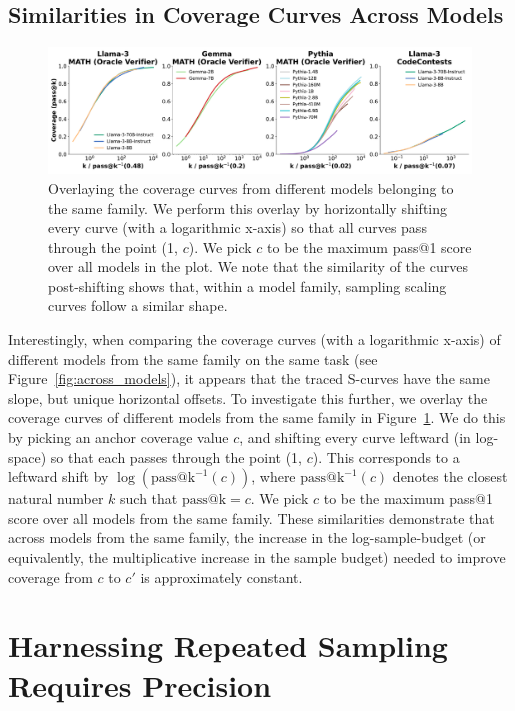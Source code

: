 \documentclass[11pt]{article}
\begin{document}
\subsection{Similarities in Coverage Curves Across Models}
\label{sec:similarities}

\begin{figure}
    \centering
    \includegraphics[width=\textwidth]{figures/align.pdf}
    \caption{Overlaying the coverage curves from different models belonging to the same family. We perform this overlay by horizontally shifting every curve (with a logarithmic x-axis) so that all curves pass through the point (1, $c$). We pick $c$ to be the maximum pass@1 score over all models in the plot. We note that the similarity of the curves post-shifting shows that, within a model family, sampling scaling curves follow a similar shape.}
    \label{fig:recentering}
\end{figure}



Interestingly, when comparing the coverage curves (with a logarithmic x-axis) of different models from the same family on the same task (see Figure~\ref{fig:across_models}), it appears that the traced S-curves have the same slope, but unique horizontal offsets. To investigate this further, we overlay the coverage curves of different models from the same family in Figure~\ref{fig:recentering}. We do this by picking an anchor coverage value $c$, and shifting every curve leftward (in log-space) so that each passes through the point (1, $c$). This corresponds to a leftward shift by $\log(\text{pass@k}^{-1}(c))$, where $\text{pass@k}^{-1}(c)$ denotes the closest natural number $k$ such that $\text{pass@k} = c$. We pick $c$ to be the maximum pass@1 score over all models from the same family. These similarities demonstrate that across models from the same family, the increase in the log-sample-budget (or equivalently, the multiplicative increase in the sample budget) needed to improve coverage from $c$ to $c'$ is approximately constant.

\section{Harnessing Repeated Sampling Requires Precision}
\label{sec:precision}
\end{document}
